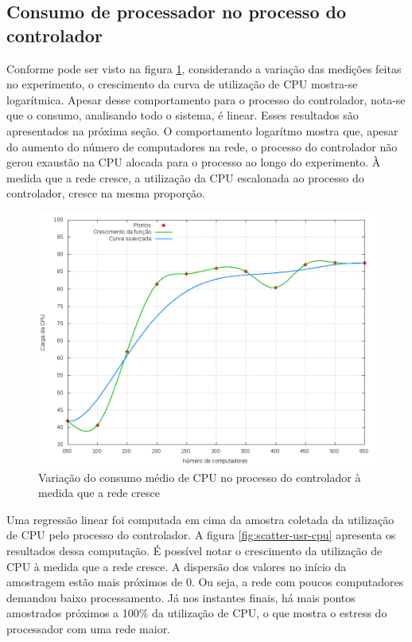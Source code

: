 \subsection{Consumo de processador no processo do controlador}


Conforme pode ser visto na figura \ref{fig:usr-cpu-growth}, considerando a 
variação das medições feitas no experimento, o crescimento da curva de 
utilização de CPU mostra-se logarítmica.
Apesar desse comportamento para o processo do controlador, nota-se que o 
consumo, analisando todo o sistema, é linear.
Esses resultados são apresentados na próxima seção. 
O comportamento logarítmo mostra que, apesar do aumento do número de
computadores na rede, o processo do controlador não gerou exaustão na CPU 
alocada para o processo ao longo do experimento.
À medida que a rede cresce, a utilização da CPU escalonada ao processo do 
controlador, cresce na mesma proporção.

\begin{figure}[htb!]
    \centering
    \label{fig:usr-cpu-growth}
    \includegraphics[width=\linewidth]{img/usr-cpu-growth.png}
    \caption{Variação do consumo médio de CPU no processo do controlador à 
    medida que a rede cresce}
\end{figure}

Uma regressão linear foi computada em cima da amostra coletada da utilização 
de CPU pelo processo do controlador.
A figura \ref{fig:scatter-usr-cpu} apresenta os resultados dessa computação.
É possível notar o crescimento da utilização de CPU à medida que a rede cresce.
A dispersão dos valores no início da amostragem estão mais próximos de 0. 
Ou seja, a rede com poucos computadores demandou baixo processamento. 
Já nos instantes finais, há mais pontos amostrados próximos a 100\% da 
utilização de CPU, o que mostra o estress do processador com uma rede maior.

